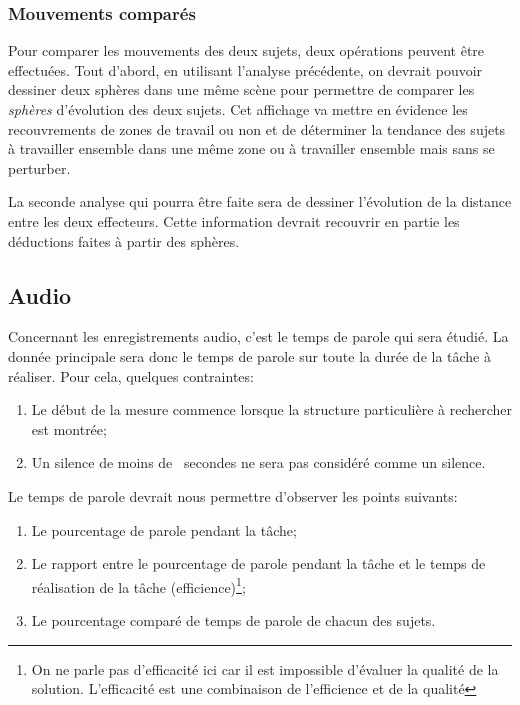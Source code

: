 \documentclass[a4paper,fleqn]{report}
\begin{document}
				\subsubsection{Mouvements comparés}
					Pour comparer les mouvements des deux sujets, deux opérations peuvent être effectuées.
					Tout d'abord, en utilisant l'analyse précédente, on devrait pouvoir dessiner deux sphères dans une même scène  pour permettre de comparer les \emph{sphères} d'évolution des deux sujets.
					Cet affichage va mettre en évidence les recouvrements de zones de travail ou non et de déterminer la tendance des sujets à travailler ensemble dans une même zone ou à travailler ensemble mais sans se perturber.

					La seconde analyse qui pourra être faite sera de dessiner l'évolution de la distance entre les deux effecteurs.
					Cette information devrait recouvrir en partie les déductions faites à partir des sphères.

			\subsection{Audio}
				Concernant les enregistrements audio, c'est le temps de parole qui sera étudié.
				La donnée principale sera donc le temps de parole sur toute la durée de la tâche à réaliser.
				Pour cela, quelques contraintes:
				\begin{enumerate}
					\item Le début de la mesure commence lorsque la structure particulière à rechercher est montrée;
					\item Un silence de moins de ~secondes ne sera pas considéré comme un silence.
				\end{enumerate}
				Le temps de parole devrait nous permettre d'observer les points suivants:
				\begin{enumerate}
					\item Le pourcentage de parole pendant la tâche;
					\item Le rapport entre le pourcentage de parole pendant la tâche et le temps de réalisation de la tâche (efficience)\footnote{On ne parle pas d'efficacité ici car il est impossible d'évaluer la qualité de la solution. L'efficacité est une combinaison de l'efficience et de la qualité};
					\item Le pourcentage comparé de temps de parole de chacun des sujets.
				\end{enumerate}
\end{document}
